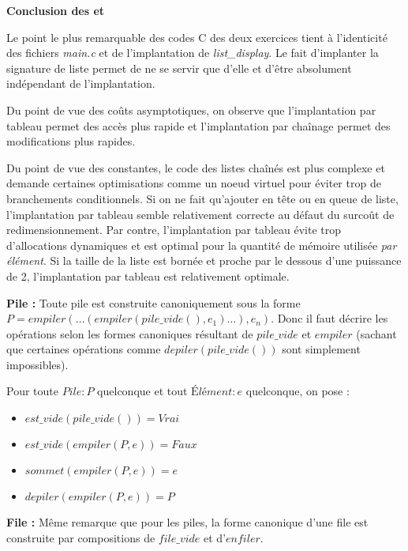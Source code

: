 \documentclass[../main.tex]{subfiles}
\begin{document}
 \textbf{Conclusion des  et }

 Le point le plus remarquable des codes C des deux exercices tient à l'identicité des fichiers \textit{main.c} et de l'implantation de \textit{list\_display}. Le fait d'implanter la signature de liste permet de ne se servir que d'elle et d'être absolument indépendant de l'implantation.

 Du point de vue des coûts asymptotiques, on observe que l'implantation par tableau permet des accès plus rapide et l'implantation par chaînage permet des modifications plus rapides.

 Du point de vue des constantes, le code des listes chaînés est plus complexe et demande certaines optimisations comme un noeud virtuel pour éviter trop de branchements conditionnels. Si on ne fait qu'ajouter en tête ou en queue de liste, l'implantation par tableau semble relativement correcte au défaut du surcoût de redimensionnement. Par contre, l'implantation par tableau évite trop d'allocations dynamiques et est optimal pour la quantité de mémoire utilisée \textit{par élément}. Si la taille de la liste est bornée et proche par le dessous d'une puissance de 2, l'implantation par tableau est relativement optimale.


\textbf{Pile :} Toute pile est construite canoniquement sous la forme $P= empiler(\dots(empiler(pile\_vide(), e_1)\dots), e_n)$. Donc il faut décrire les opérations selon les formes canoniques résultant de $pile\_vide$ et $empiler$ (sachant que certaines opérations comme $depiler(pile\_vide())$ sont simplement impossibles).

Pour toute $Pile:P$ quelconque et tout $\textit{Élément}:e$ quelconque, on pose :
\begin{itemize}
	\item $est\_vide(pile\_vide()) = \textit{Vrai}$
	\item $est\_vide(empiler(P, e)) = \textit{Faux}$
	\item $sommet(empiler(P, e)) = e$
	\item $depiler(empiler(P, e)) = P$
\end{itemize}

\textbf{File :} Même remarque que pour les piles, la forme canonique d'une file est construite par compositions de $file\_vide$ et d'$enfiler$.
\end{document}
